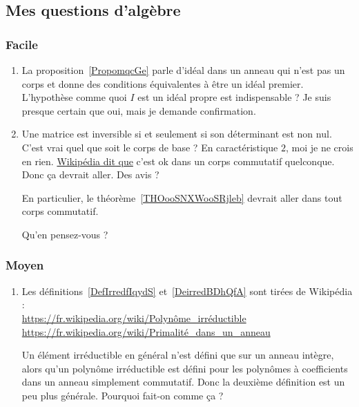 \subsection{Mes questions d'algèbre}

\subsubsection{Facile}

\begin{enumerate}
    \item
        La proposition~\ref{PropomqcGe} parle d'idéal dans un anneau qui n'est pas un corps et donne des conditions équivalentes à être un idéal premier. L'hypothèse comme quoi \( I\) est un idéal propre est indispensable ? Je suis presque certain que oui, mais je demande confirmation.
    \item       \label{ITEMooWIFJooZBzbiu}
        Une matrice est inversible si et seulement si son déterminant est non nul. C'est vrai quel que soit le corps de base ? En caractéristique \( 2\), moi je ne crois en rien. \href{https://fr.wikipedia.org/wiki/Matrice_inversible}{Wikipédia dit que} c'est ok dans un corps commutatif quelconque. Donc ça devrait aller. Des avis ?

        En particulier, le théorème~\ref{THOooSNXWooSRjleb} devrait aller dans tout corps commutatif.

        Qu'en pensez-vous ?
\end{enumerate}

\subsubsection{Moyen}

\begin{enumerate}
    \item
        Les définitions~\ref{DefIrredfIqydS} et~\ref{DeirredBDhQfA} sont tirées de Wikipédia :\\
        \url{https://fr.wikipedia.org/wiki/Polynôme_irréductible}\\
        \url{https://fr.wikipedia.org/wiki/Primalité_dans_un_anneau}

        Un élément irréductible en général n'est défini que sur un anneau intègre, alors qu'un polynôme irréductible est défini pour les polynômes à coefficients dans un anneau simplement commutatif. Donc la deuxième définition est un peu plus générale. Pourquoi fait-on comme ça ?
\end{enumerate}

